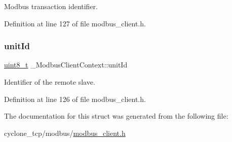 Modbus transaction identifier. 



Definition at line 127 of file modbus\+\_\+client.\+h.

\mbox{\label{struct__ModbusClientContext_a233639d3c88620f6e86a79c802b6f3e4}} 
\subsubsection{\texorpdfstring{unit\+Id}{unitId}}
{\footnotesize\ttfamily \hyperlink{stdint_8h_aba7bc1797add20fe3efdf37ced1182c5}{uint8\+\_\+t} \+\_\+\+Modbus\+Client\+Context\+::unit\+Id}



Identifier of the remote slave. 



Definition at line 126 of file modbus\+\_\+client.\+h.



The documentation for this struct was generated from the following file\+:\begin{DoxyCompactItemize}
\item 
cyclone\+\_\+tcp/modbus/\hyperlink{modbus__client_8h}{modbus\+\_\+client.\+h}\end{DoxyCompactItemize}
